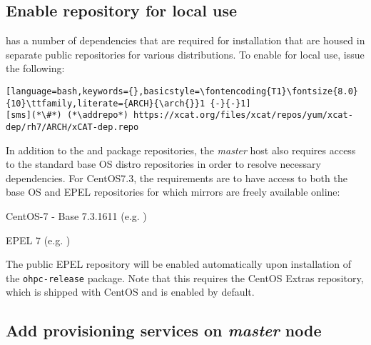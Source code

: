 \documentclass[letterpaper]{article}
\newcommand{\baseOS}{CentOS7.3}
\newcommand{\arch}{x86\_64}
\newcommand{\addrepo}{wget -P /etc/yum.repos.d}
\begin{document}
\subsection{Enable \xCAT{} repository for local use} \label{sec:enable_xcat}


\noindent \xCAT{} has a number of dependencies that are required for
installation that are housed in separate public repositories for various
distributions. To enable for local use, issue the following:

\begin{lstlisting}[language=bash,keywords={},basicstyle=\fontencoding{T1}\fontsize{8.0}{10}\ttfamily,literate={ARCH}{\arch{}}1 {-}{-}1]
[sms](*\#*) (*\addrepo*) https://xcat.org/files/xcat/repos/yum/xcat-dep/rh7/ARCH/xCAT-dep.repo
\end{lstlisting}

In addition to the \OHPC{} and \xCAT{} package repositories, the {\em master} host also
requires access to the standard base OS distro repositories in order to resolve
necessary dependencies. For \baseOS{}, the requirements are to have access to
both the base OS and EPEL repositories for which mirrors are freely available online:

\begin{itemize*}
\item CentOS-7 - Base 7.3.1611
  (e.g. \href{http://mirror.centos.org/centos-7/7/os/x86\_64}
             {\color{blue}{http://mirror.centos.org/centos-7/7/os/x86\_64}} )
\item EPEL 7 (e.g. \href{http://download.fedoraproject.org/pub/epel/7/x86\_64}
                        {\color{blue}{http://download.fedoraproject.org/pub/epel/7/x86\_64}} )
\end{itemize*}

\noindent The public EPEL repository will be enabled automatically upon installation of the 
\texttt{ohpc-release} package. Note that this requires the CentOS Extras
repository, which is shipped with CentOS and is enabled by default.




\subsection{Add provisioning services on {\em master} node} \label{sec:add_provisioning}


\end{document}
